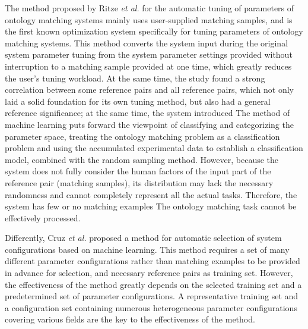 \documentclass[twoside]{article}
\begin{document}
The method proposed by Ritze {\it et al.} for the automatic tuning of parameters of ontology matching systems\cite{wwy49} mainly uses user-supplied matching samples, and is the first known optimization system specifically for tuning parameters of ontology matching systems.
This method converts the system input during the original system parameter tuning from the system parameter settings provided without interruption to a matching sample provided at one time, which greatly reduces the user's tuning workload.
At the same time, the study found a strong correlation between some reference pairs and all reference pairs, which not only laid a solid foundation for its own tuning method, but also had a general reference significance; at the same time, the system introduced The method of machine learning puts forward the viewpoint of classifying and categorizing the parameter space, treating the ontology matching problem as a classification problem and using the accumulated experimental data to establish a classification model, combined with the random sampling method.
However, because the system does not fully consider the human factors of the input part of the reference pair (matching samples), its distribution may lack the necessary randomness and cannot completely represent all the actual tasks. Therefore, the system has few or no matching examples The ontology matching task cannot be effectively processed.

Differently, Cruz {\it et al.}\cite{wwy50} proposed a method for automatic selection of system configurations based on machine learning. This method requires a set of many different parameter configurations rather than matching examples to be provided in advance for selection, and necessary reference pairs as training set.
However, the effectiveness of the method greatly depends on the selected training set and a predetermined set of parameter configurations. A representative training set and a configuration set containing numerous heterogeneous parameter configurations covering various fields are the key to the effectiveness of the method.
\end{document}
